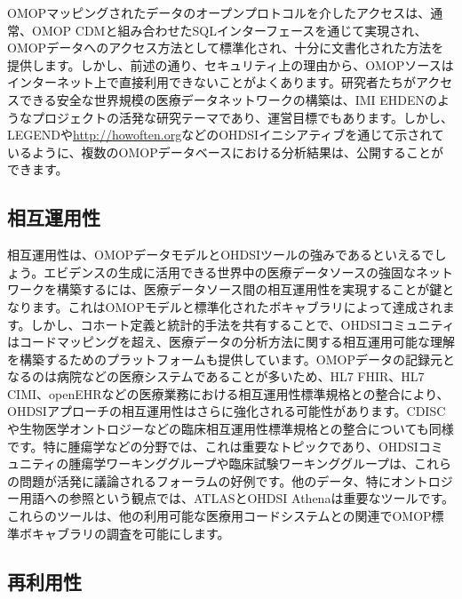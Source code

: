 \documentclass[
  11pt]{book}
\theoremstyle{definition}
\theoremstyle{definition}
\theoremstyle{definition}
\theoremstyle{definition}
\theoremstyle{remark}
\begin{document}
OMOPマッピングされたデータのオープンプロトコルを介したアクセスは、通常、OMOP CDMと組み合わせたSQLインターフェースを通じて実現され、OMOPデータへのアクセス方法として標準化され、十分に文書化された方法を提供します。しかし、前述の通り、セキュリティ上の理由から、OMOPソースはインターネット上で直接利用できないことがよくあります。研究者たちがアクセスできる安全な世界規模の医療データネットワークの構築は、IMI EHDENのようなプロジェクトの活発な研究テーマであり、運営目標でもあります。しかし、LEGENDや\href{http://howoften.org/}{http://howoften.org}などのOHDSIイニシアティブを通じて示されているように、複数のOMOPデータベースにおける分析結果は、公開することができます。

\subsection{相互運用性}\label{ux76f8ux4e92ux904bux7528ux6027}

相互運用性は、OMOPデータモデルとOHDSIツールの強みであるといえるでしょう。エビデンスの生成に活用できる世界中の医療データソースの強固なネットワークを構築するには、医療データソース間の相互運用性を実現することが鍵となります。これはOMOPモデルと標準化されたボキャブラリによって達成されます。しかし、コホート定義と統計的手法を共有することで、OHDSIコミュニティはコードマッピングを超え、医療データの分析方法に関する相互運用可能な理解を構築するためのプラットフォームも提供しています。OMOPデータの記録元となるのは病院などの医療システムであることが多いため、HL7 FHIR、HL7 CIMI、openEHRなどの医療業務における相互運用性標準規格との整合により、OHDSIアプローチの相互運用性はさらに強化される可能性があります。CDISCや生物医学オントロジーなどの臨床相互運用性標準規格との整合についても同様です。特に腫瘍学などの分野では、これは重要なトピックであり、OHDSIコミュニティの腫瘍学ワーキンググループや臨床試験ワーキンググループは、これらの問題が活発に議論されるフォーラムの好例です。他のデータ、特にオントロジー用語への参照という観点では、ATLASとOHDSI Athenaは重要なツールです。これらのツールは、他の利用可能な医療用コードシステムとの関連でOMOP標準ボキャブラリの調査を可能にします。

\subsection{再利用性}\label{ux518dux5229ux7528ux6027}
\end{document}
